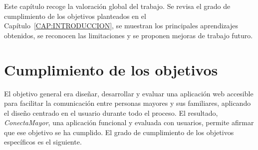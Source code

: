 Este capítulo recoge la valoración global del trabajo. Se revisa el grado de
cumplimiento de los objetivos planteados en el
Capítulo~\ref{CAP:INTRODUCCION}, se muestran los principales aprendizajes obtenidos, se reconocen las limitaciones y se proponen mejoras de trabajo futuro.


\section{Cumplimiento de los
objetivos\label{SEC:CONC_OBJETIVOS}}

El objetivo general era diseñar, desarrollar y evaluar una aplicación web
accesible para facilitar la comunicación entre personas mayores y sus
familiares, aplicando el diseño centrado en el usuario durante todo el
proceso. El resultado, \emph{ConectaMayor}, una aplicación funcional y
evaluada con usuarios, permite afirmar que ese objetivo se ha cumplido. El
grado de cumplimiento de los objetivos específicos es el siguiente.

